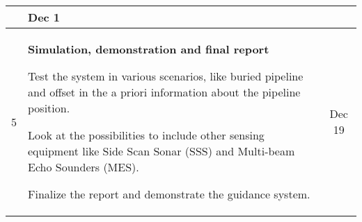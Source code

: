 \documentclass[a4paper,10pt]{article}
\newenvironment{myitemize}
{
    \begin{list}{- \ }{}
        \setlength{\topsep}{0pt}
        \setlength{\parskip}{0pt}
        \setlength{\partopsep}{0pt}
        \setlength{\parsep}{0pt}
        \setlength{\itemsep}{0pt} 
}
{
    \end{list} 
}
\begin{document}
\begin{tabular}{| c | p{9cm} || c |}
\begin{myitemize}
	 	 	               		\end{myitemize}
								&	Dec 1 \\
	\hline
	5	&	\textbf{Simulation, demonstration and final report}
						\begin{myitemize}
						 \item Test the system in various scenarios, like buried pipeline and offset in the a priori information about the pipeline position.
						 \item Look at the possibilities to include other sensing equipment like Side Scan Sonar (SSS) and Multi-beam Echo Sounders (MES).
						 \item Finalize the report and demonstrate the guidance system.
						\end{myitemize}
								&	Dec 19 \\
	\hline
	\end{tabular}
\end{document}
